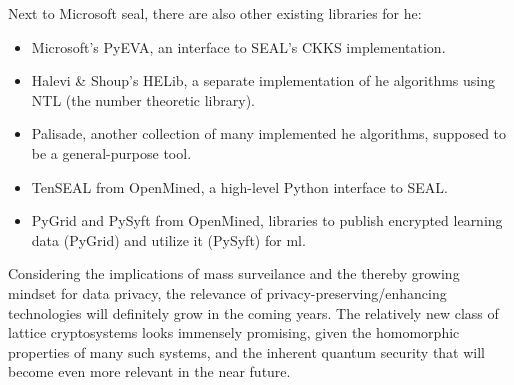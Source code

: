 Next to Microsoft \gls{seal}, there are also other existing libraries for \gls{he}:
\begin{itemize}
  \item Microsoft's PyEVA, an interface to SEAL's CKKS implementation.
  \item Halevi \& Shoup's HELib, a separate implementation of \gls{he} algorithms using NTL (the number theoretic library).
  \item Palisade, another collection of many implemented \gls{he} algorithms, supposed to be a general-purpose tool.
  \item TenSEAL from OpenMined, a high-level Python interface to SEAL.
  \item PyGrid and PySyft from OpenMined, libraries to publish encrypted learning data (PyGrid) and utilize it (PySyft) for \gls{ml}.
\end{itemize}

Considering the implications of mass surveilance and the thereby growing mindset for data privacy, the relevance of privacy-preserving/enhancing technologies will definitely grow in the coming years.
The relatively new class of lattice cryptosystems looks immensely promising, given the homomorphic properties of many such systems, and the inherent quantum security that will become even more relevant in the near future.
